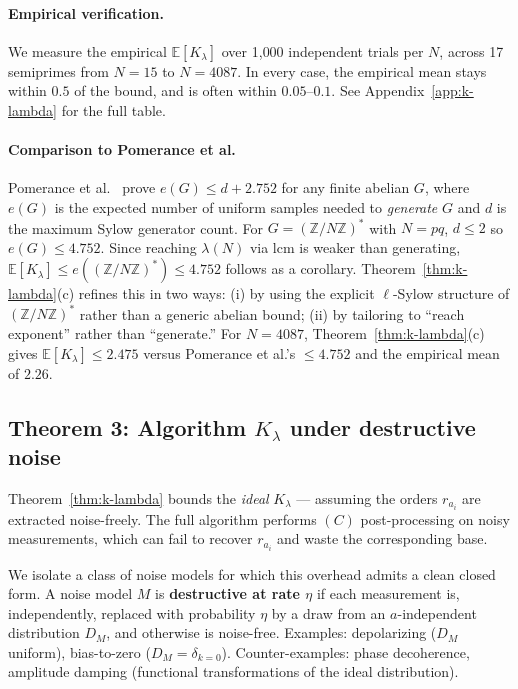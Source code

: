 \documentclass[11pt]{article}
\begin{document}
\paragraph{Empirical verification.} We measure the empirical $\mathbb{E}[K_\lambda]$ over 1{,}000 independent trials per $N$, across 17 semiprimes from $N = 15$ to $N = 4087$. In every case, the empirical mean stays within $0.5$ of the bound, and is often within $0.05$--$0.1$. See Appendix~\ref{app:k-lambda} for the full table.

\paragraph{Comparison to Pomerance et al.}
Pomerance et al.~\cite{pomerance2017} prove $e(G) \leq d + 2.752$ for any finite abelian $G$, where $e(G)$ is the expected number of uniform samples needed to \emph{generate} $G$ and $d$ is the maximum Sylow generator count. For $G = (\mathbb{Z}/N\mathbb{Z})^*$ with $N = pq$, $d \leq 2$ so $e(G) \leq 4.752$. Since reaching $\lambda(N)$ via $\mathrm{lcm}$ is weaker than generating, $\mathbb{E}[K_\lambda] \leq e((\mathbb{Z}/N\mathbb{Z})^*) \leq 4.752$ follows as a corollary. Theorem~\ref{thm:k-lambda}(c) refines this in two ways: (i) by using the explicit $\ell$-Sylow structure of $(\mathbb{Z}/N\mathbb{Z})^*$ rather than a generic abelian bound; (ii) by tailoring to ``reach exponent'' rather than ``generate.'' For $N = 4087$, Theorem~\ref{thm:k-lambda}(c) gives $\mathbb{E}[K_\lambda] \leq 2.475$ versus Pomerance et al.'s $\leq 4.752$ and the empirical mean of $2.26$.

\subsection{Theorem 3: Algorithm $K_\lambda$ under destructive noise}

Theorem~\ref{thm:k-lambda} bounds the \emph{ideal} $K_\lambda$ --- assuming the orders $r_{a_i}$ are extracted noise-freely. The full algorithm performs $(C)$ post-processing on noisy measurements, which can fail to recover $r_{a_i}$ and waste the corresponding base.

We isolate a class of noise models for which this overhead admits a clean closed form. A noise model $M$ is \textbf{destructive at rate $\eta$} if each measurement is, independently, replaced with probability $\eta$ by a draw from an $a$-independent distribution $D_M$, and otherwise is noise-free. Examples: depolarizing ($D_M$ uniform), bias-to-zero ($D_M = \delta_{k=0}$). Counter-examples: phase decoherence, amplitude damping (functional transformations of the ideal distribution).
\end{document}
